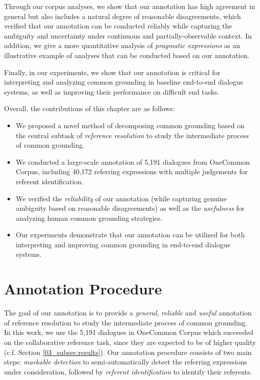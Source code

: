 Through our corpus analyses, we show that our annotation has high agreement in general but also includes a natural degree of reasonable disagreements, which verified that our annotation can be conducted reliably while capturing the ambiguity and uncertainty under continuous and partially-observable context. In addition, we give a more quantitative analysis of \textit{pragmatic expressions} as an illustrative example of analyses that can be conducted based on our annotation.

Finally, in our experiments, we show that our annotation is critical for interpreting and analyzing common grounding in baseline end-to-end dialogue systems, as well as improving their performance on difficult end tasks.

Overall, the contributions of this chapter are as follows:

\begin{itemize}
  \item We proposed a novel method of decomposing common grounding based on the central subtask of \textit{reference resolution} to study the intermediate process of common grounding.
  \item We conducted a large-scale annotation of 5,191 dialogues from OneCommon Corpus, including 40,172 referring expressions with multiple judgements for referent identification.
  \item We verified the \textit{reliability} of our annotation (while capturing genuine ambiguity based on reasonable disagreements) as well as the \textit{usefulness} for analyzing human common grounding strategies.
  \item Our experiments demonstrate that our annotation can be utilized for both interpreting and improving common grounding in end-to-end dialogue systems.
\end{itemize}

\section{Annotation Procedure}
\label{04_sec:annotation_procedure}

The goal of our annotation is to provide a \textit{general}, \textit{reliable} and \textit{useful} annotation of reference resolution to study the intermediate process of common grounding. In this work, we use the 5,191 dialogues in OneCommon Corpus which succeeded on the collaborative reference task, since they are expected to be of higher quality (c.f. Section \ref{03_subsec:results}). Our annotation procedure consists of two main steps: \textit{markable detection} to semi-automatically detect the referring expressions under consideration, followed by \textit{referent identification} to identify their referents.

